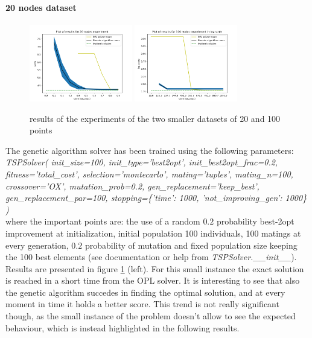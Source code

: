 \documentclass{article}
\begin{document}
\paragraph*{20 nodes dataset}

\begin{figure}
    \centering
\includegraphics[width=0.4\textwidth]{pics/20_nodes_results.png}
\includegraphics[width=0.4\textwidth]{pics/100_nodes_results.png}
 \caption{results of the experiments of the two smaller datasets of 20 and 100 points}
\label{fig:20and100points}
\end{figure}

The genetic algorithm solver has been trained using the following parameters: \\
\newline
\textit{TSPSolver(
        init\_size=100, init\_type='best2opt', init\_best2opt\_frac=0.2, fitness='total\_cost',
        selection='montecarlo', mating='tuples', mating\_n=100, crossover='OX', mutation\_prob=0.2,
        gen\_replacement='keep\_best', gen\_replacement\_par=100,
        stopping=\{'time': 1000, 'not\_improving\_gen': 1000\}
    )} \\
\newline
where the important points are: the use of a random $0.2$ probability best-2opt improvement at initialization, initial population 100 individuals, 100 matings at every generation, $0.2$ probability of mutation and fixed population size keeping the 100 best elements (see documentation or help from \textit{TSPSolver.\_\_init\_\_}). \\
Results are presented in figure \ref{fig:20and100points} (left).
For this small instance the exact solution is reached in a short time from the OPL solver. It is interesting to see that also the genetic algorithm succedes in finding the optimal solution, and at every moment in time it holds a better score. This trend is not really significant though, as the small instance of the problem doesn't allow to see the expected behaviour, which is instead highlighted in the following results. 
\end{document}
